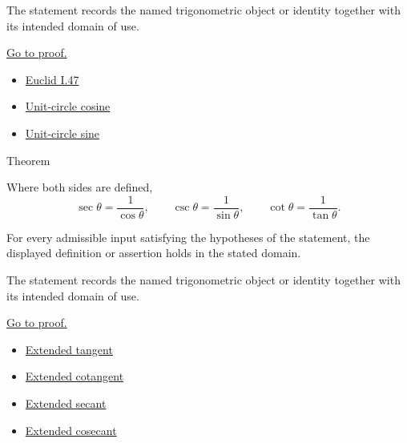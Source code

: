 \begin{remark*}[Interpretation]
The statement records the named trigonometric object or identity together with
its intended domain of use.
\end{remark*}

\begin{remark*}[Proof]
\hyperref[prf:pythagorean-trig-identity]{Go to proof.}
\end{remark*}
\begin{dependencies}
\begin{itemize}
  \item \hyperref[thm:euclid-i-47]{Euclid I.47}
  \item \hyperref[def:unit-circle-cosine]{Unit-circle cosine}
  \item \hyperref[def:unit-circle-sine]{Unit-circle sine}
\end{itemize}
\end{dependencies}



\begin{theorembox}{Theorem}
\begin{theorem}
\label{thm:trig-reciprocal-identities}
Where both sides are defined,
\[
  \sec\theta=\frac{1}{\cos\theta},\qquad
  \csc\theta=\frac{1}{\sin\theta},\qquad
  \cot\theta=\frac{1}{\tan\theta}.
\]
\end{theorem}
\end{theorembox}
\begin{remark*}
For every admissible input satisfying the hypotheses of the statement, the
displayed definition or assertion holds in the stated domain.
\end{remark*}

\begin{remark*}[Interpretation]
The statement records the named trigonometric object or identity together with
its intended domain of use.
\end{remark*}

\begin{remark*}[Proof]
\hyperref[prf:trig-reciprocal-identities]{Go to proof.}
\end{remark*}
\begin{dependencies}
\begin{itemize}
  \item \hyperref[def:extended-tangent]{Extended tangent}
  \item \hyperref[def:extended-cotangent]{Extended cotangent}
  \item \hyperref[def:extended-secant]{Extended secant}
  \item \hyperref[def:extended-cosecant]{Extended cosecant}
\end{itemize}
\end{dependencies}

